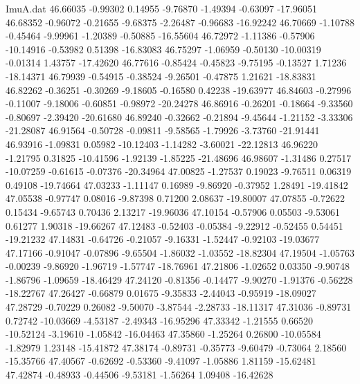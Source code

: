 \begin{filecontents}{ImuA.dat}
  46.66035   -0.99302    0.14955   -9.76870   -1.49394   -0.63097  -17.96051
  46.68352   -0.96072   -0.21655   -9.68375   -2.26487   -0.96683  -16.92242
  46.70669   -1.10788   -0.45464   -9.99961   -1.20389   -0.50885  -16.55604
  46.72972   -1.11386   -0.57906  -10.14916   -0.53982    0.51398  -16.83083
  46.75297   -1.06959   -0.50130  -10.00319   -0.01314    1.43757  -17.42620
  46.77616   -0.85424   -0.45823   -9.75195   -0.13527    1.71236  -18.14371
  46.79939   -0.54915   -0.38524   -9.26501   -0.47875    1.21621  -18.83831
  46.82262   -0.36251   -0.30269   -9.18605   -0.16580    0.42238  -19.63977
  46.84603   -0.27996   -0.11007   -9.18006   -0.60851   -0.98972  -20.24278
  46.86916   -0.26201   -0.18664   -9.33560   -0.80697   -2.39420  -20.61680
  46.89240   -0.32662   -0.21894   -9.45644   -1.21152   -3.33306  -21.28087
  46.91564   -0.50728   -0.09811   -9.58565   -1.79926   -3.73760  -21.91441
  46.93916   -1.09831    0.05982  -10.12403   -1.14282   -3.60021  -22.12813
  46.96220   -1.21795    0.31825  -10.41596   -1.92139   -1.85225  -21.48696
  46.98607   -1.31486    0.27517  -10.07259   -0.61615   -0.07376  -20.34964
  47.00825   -1.27537    0.19023   -9.76511    0.06319    0.49108  -19.74664
  47.03233   -1.11147    0.16989   -9.86920   -0.37952    1.28491  -19.41842
  47.05538   -0.97747    0.08016   -9.87398    0.71200    2.08637  -19.80007
  47.07855   -0.72622    0.15434   -9.65743    0.70436    2.13217  -19.96036
  47.10154   -0.57906    0.05503   -9.53061    0.61277    1.90318  -19.66267
  47.12483   -0.52403   -0.05384   -9.22912   -0.52455    0.54451  -19.21232
  47.14831   -0.64726   -0.21057   -9.16331   -1.52447   -0.92103  -19.03677
  47.17166   -0.91047   -0.07896   -9.65504   -1.86032   -1.03552  -18.82304
  47.19504   -1.05763   -0.00239   -9.86920   -1.96719   -1.57747  -18.76961
  47.21806   -1.02652    0.03350   -9.90748   -1.86796   -1.09659  -18.46429
  47.24120   -0.81356   -0.14477   -9.90270   -1.91376   -0.56228  -18.22767
  47.26427   -0.66879    0.01675   -9.35833   -2.44043   -0.95919  -18.09027
  47.28729   -0.70229    0.26082   -9.50070   -3.87544   -2.28733  -18.11317
  47.31036   -0.89731    0.72742  -10.03669   -4.53187   -2.49343  -16.95296
  47.33342   -1.21555    0.66520  -10.52124   -3.19610   -1.05842  -16.04463
  47.35860   -1.25264    0.26800  -10.05584   -1.82979    1.23148  -15.41872
  47.38174   -0.89731   -0.35773   -9.60479   -0.73064    2.18560  -15.35766
  47.40567   -0.62692   -0.53360   -9.41097   -1.05886    1.81159  -15.62481
  47.42874   -0.48933   -0.44506   -9.53181   -1.56264    1.09408  -16.42628

\end{filecontents}
